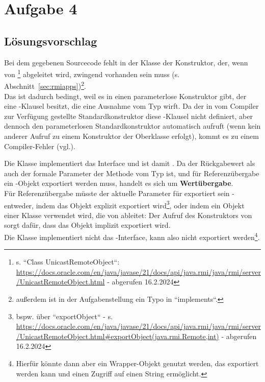 \section{Aufgabe 4}
\subsection{Lösungsvorschlag}

Bei dem gegebenen Sourcecode fehlt in der Klasse  der Konstruktor, der, wenn von \footnote{
s. ``Class UnicastRemoteObject``: \url{https://docs.oracle.com/en/java/javase/21/docs/api/java.rmi/java/rmi/server/UnicastRemoteObject.html} - abgerufen 16.2.2024
} abgeleitet wird, zwingend vorhanden sein muss (s. Abschnitt~\ref{sec:rmiapps})\footnote{
außerdem ist in der Aufgabenstellung ein Typo in ``implements``.
}.\\
Das ist dadurch bedingt, weil es in  einen parameterlose Konstruktor gibt, der eine -Klausel besitzt, die eine Ausnahme vom Typ  wirft.
Da der in  vom Compiler zur Verfügung gestellte Standardkonstruktor diese -Klausel nicht definiert, aber dennoch den parameterlosen Standardkonstruktor automatisch aufruft (wenn kein anderer Aufruf zu einem Konstruktor der Oberklasse erfolgt), kommt es zu einem Compiler-Fehler (vgl.\cite[313]{Oec22}).


\noindent
Die Klasse  implementiert das Interface  und ist damit .
Da der Rückgabewert als auch der formale Parameter der Methode  vom Typ  ist, und für Referenzübergabe ein -Objekt exportiert werden muss, handelt es sich um \textbf{Wertübergabe}.\\
Für Referenzübergabe müsste der aktuelle Parameter für  exportiert sein - entweder, indem das Objekt explizit exportiert wird\footnote{
bspw. über ``exportObject`` - s. \url{https://docs.oracle.com/en/java/javase/21/docs/api/java.rmi/java/rmi/server/UnicastRemoteObject.html#exportObject(java.rmi.Remote,int)} - abgerufen 16.2.2024
}, oder indem ein Objekt einer Klasse verwendet wird, die von  ableitet: Der Aufruf des Konstruktors von  sorgt dafür, dass das Objekt implizit exportiert wird.\\
Die Klasse  implementiert nicht das -Interface, kann also nicht exportiert werden\footnote{
Hierfür könnte dann aber ein Wrapper-Objekt genutzt werden, das exportiert werden kann und einen Zugriff auf einen String ermöglicht.}.\\


